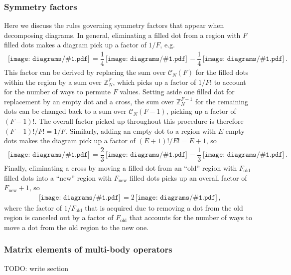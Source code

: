 \documentclass[nofootinbib,notitlepage,11pt]{revtex4-2}
\renewcommand{\t}{\text} %
\newcommand{\f}[2]{\dfrac{#1}{#2}} %
\newcommand{\p}[1]{\left(#1\right)} %
\newcommand{\1}{\mathds{1}}
\newcommand{\C}{\mathcal{C}}
\newcommand{\ZZ}{\mathbb{Z}}
\newcommand{\diagram}[1]
{\,\texttt{[image: diagrams/\#1.pdf]}\,}
\newcommand{\red}[1]{{\color{red} #1}}
\begin{document}
\subsubsection{Symmetry factors}

Here we discuss the rules governing symmetry factors that appear when
decomposing diagrams.  In general, eliminating a filled dot from a
region with $F$ filled dots makes a diagram pick up a factor of $1/F$,
e.g.
\begin{align}
  \diagram{example_sym}
  = \f14 \diagram{example_sym_o}
  - \f14 \diagram{example_sym_x}.
\end{align}
This factor can be derived by replacing the sum over $\C_N\p{F}$ for
the filled dots within the region by a sum over $\ZZ_N^{F}$, which
picks up a factor of $1/F!$ to account for the number of ways to
permute $F$ values.  Setting aside one filled dot for replacement by
an empty dot and a cross, the sum over $\ZZ_N^{F-1}$ for the remaining
dots can be changed back to a sum over $\C_N\p{F-1}$, picking up a
factor of $\p{F-1}!$.  The overall factor picked up throughout this
procedure is therefore $\p{F-1}!/F!=1/F$.  Similarly, adding an empty
dot to a region with $E$ empty dots makes the diagram pick up a factor
of $\p{E+1}!/E!=E+1$, so
\begin{align}
  \diagram{example_sym_o}
  = \f23 \diagram{example_sym_oo}
  - \f13 \diagram{example_sym_ox}.
\end{align}
Finally, eliminating a cross by moving a filled dot from an ``old''
region with $F_{\t{old}}$ filled dots into a ``new'' region with
$F_{\t{new}}$ filled dots picks up an overall factor of
$F_{\t{new}}+1$, so
\begin{align}
  \diagram{example_sym_x}
  = 2 \diagram{example_sym_x_elim},
\end{align}
where the factor of $1/F_{\t{old}}$ that is acquired due to removing a
dot from the old region is canceled out by a factor of $F_{\t{old}}$
that accounts for the number of ways to move a dot from the old region
to the new one.

\subsubsection{Matrix elements of multi-body operators}

\red{TODO: write section}

\end{document}
